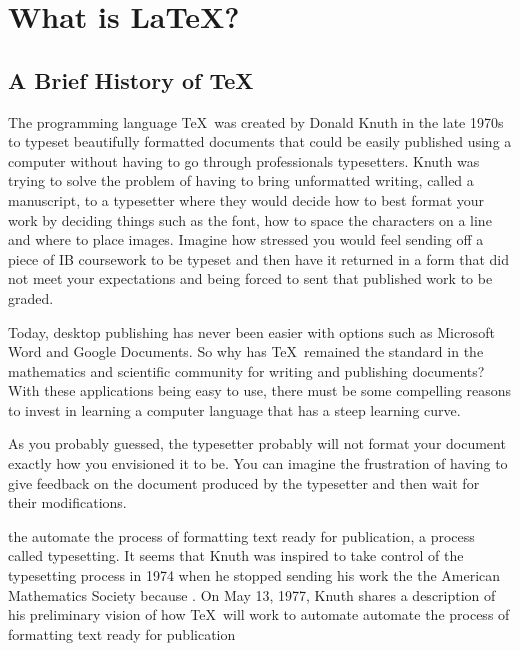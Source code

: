 \chapter{What is \LaTeX?}

\section{A Brief History of \TeX}

The programming language \TeX\ was created by Donald Knuth in the late
1970s to typeset beautifully formatted documents that could be easily published
using a computer without having to go through professionals typesetters.
Knuth was trying to solve the problem of having to bring unformatted writing,
called a manuscript, to a typesetter where they would decide how to best format
your work by deciding things such as the font, how to space the characters on a
line and where to place images. Imagine how stressed you would feel sending off
a piece of IB coursework to be typeset and then have it returned in a form
that did not meet your expectations and being forced to sent that published
work to be graded.

Today, desktop publishing has never been easier with options such as Microsoft
Word and Google Documents.  So why has \TeX\ remained the standard in the
mathematics and scientific community for writing and publishing documents?
With these applications being easy to use, there must be some compelling
reasons to invest in learning a computer language that has a steep learning
curve.

As you probably guessed, the typesetter probably will not format your document 
exactly how you envisioned it to be.  You can imagine the frustration of having 
to give feedback on the document produced by the typesetter and then wait for their 
modifications. 

the automate the process of formatting text ready for publication, 
a process called typesetting.  It seems that Knuth was inspired to take control
of the typesetting process in 1974 when he stopped sending his work
the the American Mathematics Society because .  On May 13, 1977, Knuth 
shares a description of his preliminary vision of how \TeX\ will work to automate 
automate the process of formatting text ready for publication

